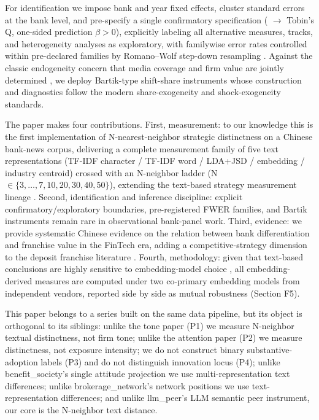 For identification we impose bank and year fixed effects, cluster
standard errors at the bank level, and pre-specify a single
confirmatory specification ( $\to$ Tobin's Q,
one-sided prediction $\beta>0$), explicitly labeling all alternative
measures, tracks, and heterogeneity analyses as exploratory, with
familywise error rates controlled within pre-declared families by
Romano--Wolf step-down resampling
\parencite{romano2005stepwise,list2019multiplehypothesis}. Against the
classic endogeneity concern that media coverage and firm value are
jointly determined \parencite{gurun2012hype}, we deploy Bartik-type
shift-share instruments whose construction and diagnostics follow the
modern share-exogeneity \parencite{goldsmith2020bartik} and
shock-exogeneity
\parencite{borusyak2022shiftshare,borusyak2025shiftshareguide}
standards.

The paper makes four contributions. First, measurement: to our
knowledge this is the first implementation of N-nearest-neighbor
strategic distinctness on a Chinese bank-news corpus, delivering a
complete measurement family of five text representations (TF-IDF
character / TF-IDF word / LDA+JSD / embedding / industry centroid)
crossed with an N-neighbor ladder
(N$\in\{3,\dots,7,10,20,30,40,50\}$), extending the text-based
strategy measurement lineage
\parencite{guzman2023strategy,bellstam2021innovation,banker2024strategy,hoberg2025scope}.
Second, identification and inference discipline: explicit
confirmatory/exploratory boundaries, pre-registered FWER families,
and Bartik instruments remain rare in observational bank-panel work.
Third, evidence: we provide systematic Chinese evidence on the
relation between bank differentiation and franchise value in the
FinTech era, adding a competitive-strategy dimension to the deposit
franchise literature \parencite{drechsler2026franchise}. Fourth,
methodology: given that text-based conclusions are highly sensitive
to embedding-model choice \parencite{ganguli2024patenttext}, all
embedding-derived measures are computed under two co-primary
embedding models from independent vendors, reported side by side as
mutual robustness (Section F5).

This paper belongs to a series built on the same data pipeline, but
its object is orthogonal to its siblings: unlike the tone paper (P1)
we measure N-neighbor textual distinctness, not firm tone; unlike the
attention paper (P2) we measure distinctness, not exposure intensity;
we do not construct binary substantive-adoption labels (P3) and do
not distinguish innovation locus (P4); unlike benefit\_society's
single attitude projection we use multi-representation text
differences; unlike brokerage\_network's network positions we use
text-representation differences; and unlike llm\_peer's LLM semantic
peer instrument, our core is the N-neighbor text distance.

